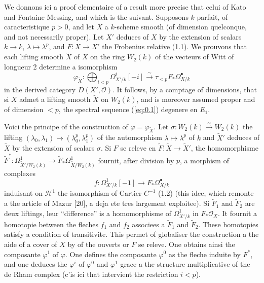 \documentclass[12pt,a4paper]{article}
\theoremstyle{plain}
\theoremstyle{definition}
\theoremstyle{remark}
\newcommand{\cO}{\mathcal{O}}
\begin{document}
We donnons ici a proof elementaire of a result more precise that
celui of Kato and Fontaine-Messing, and which is the suivant. Supposons $k$ parfait, of
caracteristique $p > 0$, and let $X$ a $k$-scheme smooth (of dimension quelconque, and not
necessarily proper). Let $X'$ deduces of $X$ by the extension of scalars $k \to k$,
$\lambda \mapsto \lambda^p$, and $F: X \to X'$ the Frobenius relative (1.1). We prouvons that each
lifting smooth $\tilde{X}$ of $X$ on the ring $W_2(k)$ of the vecteurs of Witt of longueur 2
determine a isomorphism
\begin{equation}\label{eq:0.2}
\varphi_{\tilde{X}}: \bigoplus_{i < p} \Omega^i_{X'/k}[-i] \xrightarrow{\sim} \tau_{<p} F_* \Omega^{\bullet}_{X/k}
\end{equation}
in the derived category $D(X', \cO)$. It follows, by a comptage of dimensions,
that si $X$ admet a lifting smooth $\tilde{X}$ on $W_2(k)$, and is moreover assumed proper and of dimension $<p$, the spectral sequence (\ref{eq:0.1}) degenere en $E_1$.

Voici the principe of the construction of $\varphi = \varphi_{\tilde{X}}$. Let $\sigma: W_2(k) \xrightarrow{\sim} W_2(k)$ the
lifting $(\lambda_0, \lambda_1) \mapsto (\lambda_0^p, \lambda_1^p)$ of the automorphism $\lambda \mapsto \lambda^p$ of $k$ and $\tilde{X}'$ deduces of $\tilde{X}$ by
the extension of scalars $\sigma$. Si $F$ se releve en $\tilde{F}: \tilde{X} \to \tilde{X}'$, the homomorphisme
$\tilde{F}^*: \Omega^1_{\tilde{X}'/W_2(k)} \to \tilde{F}_* \Omega^1_{\tilde{X}/W_2(k)}$ fournit, after division by $p$, a morphism of complexes
\[
f: \Omega^1_{X'/k}[-1] \to F_* \Omega^{\bullet}_{X/k}
\]
induisant on $\mathscr{H}^1$ the isomorphism of Cartier $C^{-1}$ (1.2) (this idee, which remonte a
the article of Mazur [20], a deja ete tres largement exploitee). Si $\tilde{F}_1$ and $\tilde{F}_2$ are deux
liftings, leur ``difference'' is a homomorphisme of $\Omega^1_{X'/k}$ in $F_* \cO_X$. It
fournit a homotopie between the fleches $f_1$ and $f_2$ associees a $\tilde{F}_1$ and $\tilde{F}_2$. These
homotopies satisfy a condition of transitivite. This permet of globaliser the
construction a the aide of a cover of $X$ by of the ouverts or $F$ se releve. One obtains ainsi the composante $\varphi^1$ of $\varphi$. One defines the composante $\varphi^0$ as the fleche
induite by $F^*$, and one deduces the $\varphi^i$ of $\varphi^0$ and $\varphi^1$ grace a the structure multiplicative of the
de Rham complex (c'is ici that intervient the restriction $i < p$).
\end{document}
